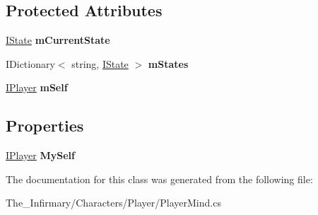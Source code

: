 \subsection*{Protected Attributes}
\begin{DoxyCompactItemize}
\item 
\mbox{\label{class_the___infirmary_1_1_characters_1_1_player_1_1_player_mind_a160627caaa822d3e8c16948d3a06e369}} 
\mbox{\hyperlink{interface_g_m_t_b_1_1_interfaces_1_1_i_state}{I\+State}} {\bfseries m\+Current\+State}
\item 
\mbox{\label{class_the___infirmary_1_1_characters_1_1_player_1_1_player_mind_a745d905924dfc05c37cc8844cec458b0}} 
I\+Dictionary$<$ string, \mbox{\hyperlink{interface_g_m_t_b_1_1_interfaces_1_1_i_state}{I\+State}} $>$ {\bfseries m\+States}
\item 
\mbox{\label{class_the___infirmary_1_1_characters_1_1_player_1_1_player_mind_a81b80425f8e00aebb77d7af3bd7c35e2}} 
\mbox{\hyperlink{interface_g_m_t_b_1_1_interfaces_1_1_i_player}{I\+Player}} {\bfseries m\+Self}
\end{DoxyCompactItemize}
\subsection*{Properties}
\begin{DoxyCompactItemize}
\item 
\mbox{\label{class_the___infirmary_1_1_characters_1_1_player_1_1_player_mind_a36d279d3cb5aa09f69687b0ded946139}} 
\mbox{\hyperlink{interface_g_m_t_b_1_1_interfaces_1_1_i_player}{I\+Player}} {\bfseries My\+Self}
\end{DoxyCompactItemize}


The documentation for this class was generated from the following file\+:\begin{DoxyCompactItemize}
\item 
The\+\_\+\+Infirmary/\+Characters/\+Player/Player\+Mind.\+cs\end{DoxyCompactItemize}
